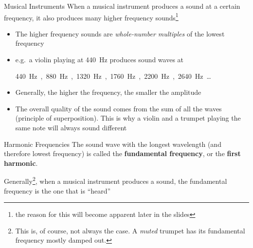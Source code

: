 \documentclass[12pt,compress,aspectratio=169]{beamer}
\begin{document}
\begin{frame}{Musical Instruments}
  When a musical instrument produces a sound at a certain frequency, it also
  produces many higher frequency sounds\footnote{the reason for this will
    become apparent later in the slides}
  \begin{itemize}
  \item The higher frequency sounds are \emph{whole-number multiples} of the
    lowest frequency
  \item e.g.\ a violin playing at \SI{440}{\hertz} produces sound waves at
    \begin{center}
      {\Large
        \vspace{.1in}
        \SI{440}\hertz, \SI{880}\hertz, \SI{1320}\hertz, \SI{1760}\hertz,
        \SI{2200}\hertz, \SI{2640}\hertz\ldots
        \vspace{.1in}
      }
    \end{center}
  \item Generally, the higher the frequency, the smaller the amplitude
  \item The overall quality of the sound comes from the sum of all the waves
    (principle of superposition). This is why a violin and a trumpet playing
    the same note will always sound different
  \end{itemize}
\end{frame}



\begin{frame}[t]{Harmonic Frequencies}
  The sound wave with the longest wavelength (and therefore lowest frequency)
  is called the \textbf{fundamental frequency}, or the \textbf{first harmonic}.
  \begin{center}
    \hspace{.15in}
    \hspace{.15in}
  \end{center}
  Generally\footnote{This is, of course, not always the case. A \emph{muted}
  trumpet has its fundamental frequency mostly damped out.}, when a musical
  instrument produces a sound, the fundamental frequency is the one that is
  ``heard''
\end{frame}
\end{document}
